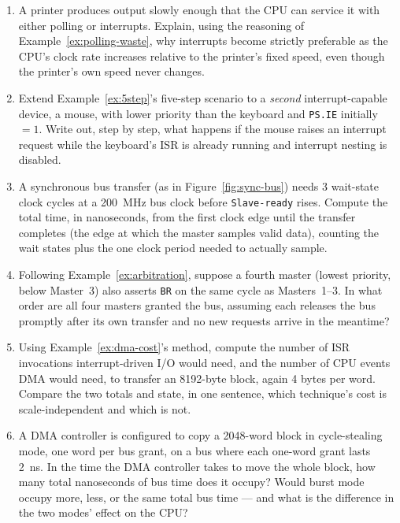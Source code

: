 \documentclass[11pt]{article}
\begin{document}
\begin{enumerate}
  \item A printer produces output slowly enough that the CPU can service it with either polling or interrupts. Explain, using the reasoning of Example~\ref{ex:polling-waste}, why interrupts become strictly preferable as the CPU's clock rate increases relative to the printer's fixed speed, even though the printer's own speed never changes.
  \item Extend Example~\ref{ex:5step}'s five-step scenario to a \emph{second} interrupt-capable device, a mouse, with lower priority than the keyboard and \texttt{PS.IE} initially $=1$. Write out, step by step, what happens if the mouse raises an interrupt request while the keyboard's ISR is already running and interrupt nesting is disabled.
  \item A synchronous bus transfer (as in Figure~\ref{fig:sync-bus}) needs 3 wait-state clock cycles at a 200~MHz bus clock before \texttt{Slave-ready} rises. Compute the total time, in nanoseconds, from the first clock edge until the transfer completes (the edge at which the master samples valid data), counting the wait states plus the one clock period needed to actually sample.
  \item Following Example~\ref{ex:arbitration}, suppose a fourth master (lowest priority, below Master~3) also asserts \texttt{BR} on the same cycle as Masters~1--3. In what order are all four masters granted the bus, assuming each releases the bus promptly after its own transfer and no new requests arrive in the meantime?
  \item Using Example~\ref{ex:dma-cost}'s method, compute the number of ISR invocations interrupt-driven I/O would need, and the number of CPU events DMA would need, to transfer an 8192-byte block, again 4 bytes per word. Compare the two totals and state, in one sentence, which technique's cost is scale-independent and which is not.
  \item A DMA controller is configured to copy a 2048-word block in cycle-stealing mode, one word per bus grant, on a bus where each one-word grant lasts 2~ns. In the time the DMA controller takes to move the whole block, how many total nanoseconds of bus time does it occupy? Would burst mode occupy more, less, or the same total bus time --- and what is the difference in the two modes' effect on the CPU?
\end{enumerate}
\end{document}
